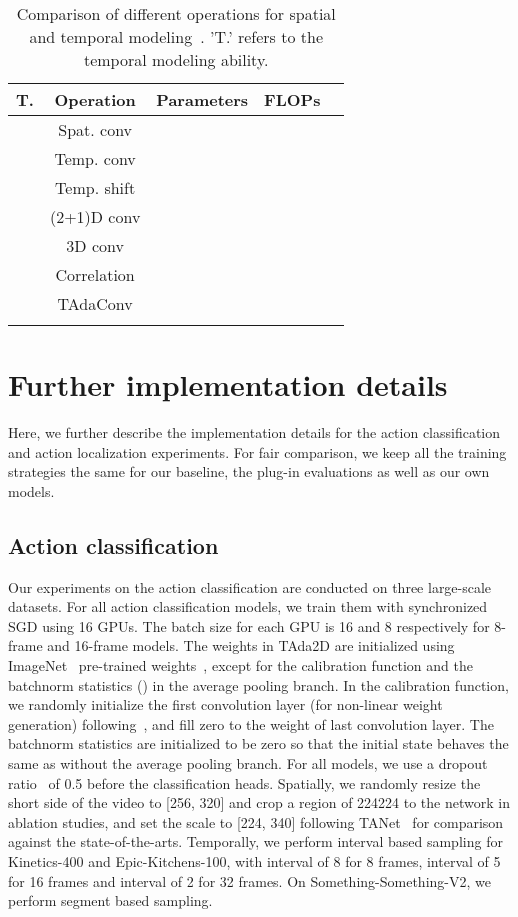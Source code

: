 \documentclass{article} \usepackage{iclr2022_conference,times}
\newcommand{\cmark}{\color{forestgreen}\ding{51}}\newcommand{\xmark}{\color{red}\ding{55}}\usepackage{pifont}
\newcommand{\tablestyle}[2]{\setlength{\tabcolsep}{#1}\renewcommand{\arraystretch}{#2}\centering\small}
\def\x{}
\begin{document}
\begin{table}[t]
\caption{Comparison of different operations for spatial and temporal modeling~\citep{tsm,r21d,corrnet,retrace}. 'T.' refers to the temporal modeling ability.
}
\centering
\tablestyle{2pt}{1.0}
\begin{tabular}{lcccc}
\shline
\bf T. & \bf Operation & \bf Parameters & \bf FLOPs \\
\hline
\xmark & Spat. conv &  &   \\
\hline
\cmark & Temp. conv &  &   \\
\cmark & Temp. shift &  &  \\
\cmark & (2+1)D conv &  &  \\
\cmark & 3D conv &  &  \\
\cmark & Correlation &  & \\
\hline
\multirow{2}{*}{\cmark} & \multirow{2}{*}{TAdaConv} & \multirow{2}{*}{} & \\
~ & ~ & ~ & \\
\shline
\end{tabular}
\label{tab:apptemporalmodellingcomparison}
\end{table}


\section{Further implementation details}
\label{appendix:implementationdetails}
Here, we further describe the implementation details for the action classification and action localization experiments.
For fair comparison, we keep all the training strategies the same for our baseline, the plug-in evaluations as well as our own models.

\subsection{Action classification}
Our experiments on the action classification are conducted on three large-scale datasets.
For all action classification models, we train them with synchronized SGD using 16 GPUs. The batch size for each GPU is 16 and 8 respectively for 8-frame and 16-frame models. The weights in TAda2D are initialized using ImageNet~\citep{imagenet} pre-trained weights~\citep{resnet}, except for the calibration function  and the batchnorm statistics () in the average pooling branch.
In the calibration function, we randomly initialize the first convolution layer (for non-linear weight generation) following~\citet{kaiminginit}, and fill zero to the weight of last convolution layer. 
The batchnorm statistics are initialized to be zero so that the initial state behaves the same as without the average pooling branch. For all models, we use a dropout ratio~\citep{dropout} of 0.5 before the classification heads. Spatially, we randomly resize the short side of the video to [256, 320] and crop a region of 224\x224 to the network in ablation studies, and set the scale to [224, 340] following TANet~\citep{tam} for comparison against the state-of-the-arts. Temporally, we perform interval based sampling for Kinetics-400 and Epic-Kitchens-100, with interval of 8 for 8 frames, interval of 5 for 16 frames and interval of 2 for 32 frames. On Something-Something-V2, we perform segment based sampling.
\end{document}

